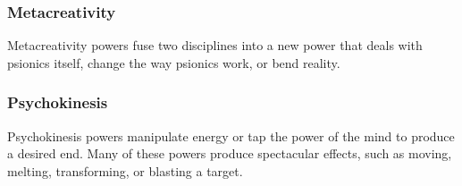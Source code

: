 \subsubsection{Metacreativity}
Metacreativity powers fuse two disciplines into a new power that deals with psionics itself, change the way psionics work, or bend reality.





\subsubsection{Psychokinesis}
Psychokinesis powers manipulate energy or tap the power of the mind to produce a desired end. Many of these powers produce spectacular effects, such as moving, melting, transforming, or blasting a target. %

